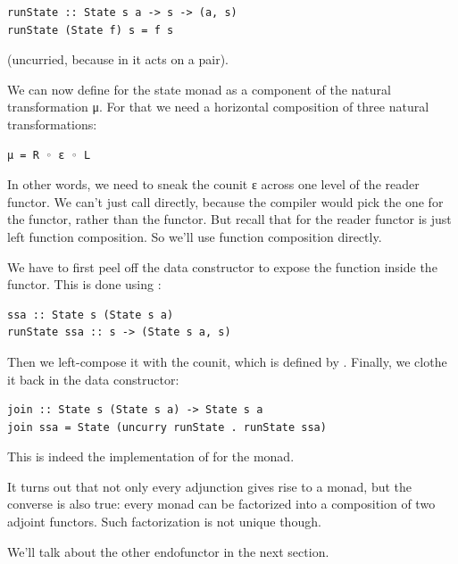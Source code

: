 \begin{verbatim}
runState :: State s a -> s -> (a, s)
runState (State f) s = f s
\end{verbatim}
(uncurried, because in  it acts on a pair).

We can now define  for the state monad as a component of
the natural transformation μ. For that we need a horizontal composition
of three natural transformations:

\begin{verbatim}
μ = R ◦ ε ◦ L
\end{verbatim}
In other words, we need to sneak the counit ε across one level of the
reader functor. We can't just call  directly, because the
compiler would pick the one for the  functor, rather than
the  functor. But recall that  for the
reader functor is just left function composition. So we'll use function
composition directly.

We have to first peel off the data constructor  to expose
the function inside the  functor. This is done using
:

\begin{verbatim}
ssa :: State s (State s a)
runState ssa :: s -> (State s a, s)
\end{verbatim}
Then we left-compose it with the counit, which is defined by
. Finally, we clothe it back in the
 data constructor:

\begin{verbatim}
join :: State s (State s a) -> State s a
join ssa = State (uncurry runState . runState ssa)
\end{verbatim}
This is indeed the implementation of  for the
 monad.

It turns out that not only every adjunction gives rise to a monad, but
the converse is also true: every monad can be factorized into a
composition of two adjoint functors. Such factorization is not unique
though.

We'll talk about the other endofunctor  in the next
section.